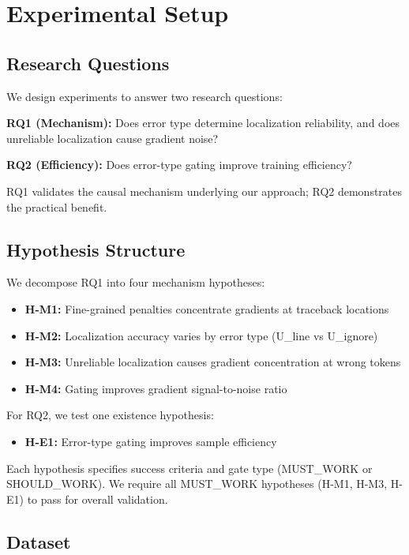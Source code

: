 \section{Experimental Setup}

\subsection{Research Questions}

We design experiments to answer two research questions:

\textbf{RQ1 (Mechanism):} Does error type determine localization reliability, and does unreliable localization cause gradient noise?

\textbf{RQ2 (Efficiency):} Does error-type gating improve training efficiency?

RQ1 validates the causal mechanism underlying our approach; RQ2 demonstrates the practical benefit.

\subsection{Hypothesis Structure}

We decompose RQ1 into four mechanism hypotheses:
\begin{itemize}
\item \textbf{H-M1:} Fine-grained penalties concentrate gradients at traceback locations
\item \textbf{H-M2:} Localization accuracy varies by error type (U\_line vs U\_ignore)
\item \textbf{H-M3:} Unreliable localization causes gradient concentration at wrong tokens
\item \textbf{H-M4:} Gating improves gradient signal-to-noise ratio
\end{itemize}

For RQ2, we test one existence hypothesis:
\begin{itemize}
\item \textbf{H-E1:} Error-type gating improves sample efficiency
\end{itemize}

Each hypothesis specifies success criteria and gate type (MUST\_WORK or SHOULD\_WORK). We require all MUST\_WORK hypotheses (H-M1, H-M3, H-E1) to pass for overall validation.

\subsection{Dataset}

